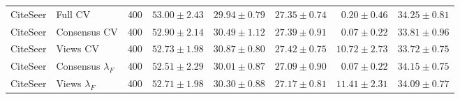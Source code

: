 \begin{longtable}{llrrrrrr}
CiteSeer & Full CV & 400 & $53.00\pm2.43$ & $29.94\pm0.79$ & $27.35\pm0.74$ & $0.20\pm0.46$ & $34.25\pm0.81$\\
CiteSeer & Consensus CV & 400 & $52.90\pm2.14$ & $30.49\pm1.12$ & $27.39\pm0.91$ & $0.07\pm0.22$ & $33.81\pm0.96$\\
CiteSeer & Views CV & 400 & $52.73\pm1.98$ & $30.87\pm0.80$ & $27.42\pm0.75$ & $10.72\pm2.73$ & $33.72\pm0.75$\\
CiteSeer & Consensus $\lambda_F$ & 400 & $52.51\pm2.29$ & $30.01\pm0.87$ & $27.09\pm0.90$ & $0.07\pm0.22$ & $34.15\pm0.75$\\
CiteSeer & Views $\lambda_F$ & 400 & $52.71\pm1.98$ & $30.30\pm0.88$ & $27.17\pm0.81$ & $11.41\pm2.31$ & $34.09\pm0.77$\\
\end{longtable}
\endgroup
